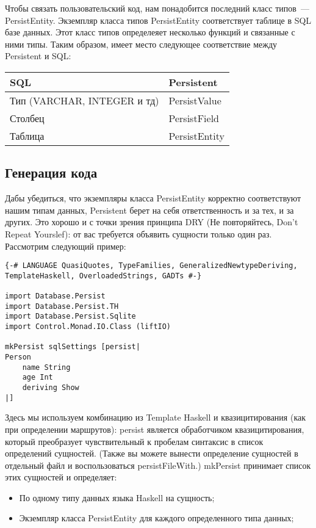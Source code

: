 Чтобы связать пользовательский код, нам понадобится последний класс типов~--- PersistEntity. Экземпляр класса типов PersistEntity соответствует таблице в SQL базе данных. Этот класс типов определеяет несколько функций и связанные с ними типы. Таким образом, имеет место следующее соответствие между Persistent и SQL:

\begin{center}
\begin{tabular}{ | l | l |}
\hline
SQL	& Persistent \\ \hline
Тип (VARCHAR, INTEGER и тд)	& PersistValue \\ \hline
Столбец & PersistField \\ \hline
Таблица	& PersistEntity \\ \hline
\end{tabular}
\end{center}

\subsection{Генерация кода} %

Дабы убедиться, что экземпляры класса PersistEntity корректно соответствуют нашим типам данных, Persistent берет на себя ответственность и за тех, и за других. Это хорошо и с точки зрения принципа DRY (Не повторяйтесь, Don't Repeat Yourslef): от вас требуется объявить сущности только один раз. Рассмотрим следующий пример:

\begin{lstlisting}
{-# LANGUAGE QuasiQuotes, TypeFamilies, GeneralizedNewtypeDeriving, TemplateHaskell, OverloadedStrings, GADTs #-}

import Database.Persist
import Database.Persist.TH
import Database.Persist.Sqlite
import Control.Monad.IO.Class (liftIO)

mkPersist sqlSettings [persist|
Person
    name String
    age Int
    deriving Show
|]
\end{lstlisting}

Здесь мы используем комбинацию из Template Haskell и квазицитирования (как при
определении маршрутов): persist является обработчиком квазицитирования, который
преобразует чувствительный к пробелам синтаксис в список определений сущностей.
(Также вы можете вынести определение сущностей в отдельный файл и
воспользоваться persistFileWith.) mkPersist принимает список этих сущностей и определяет:

\begin{itemize}
  \item По одному типу данных языка Haskell на сущность;
  \item Экземпляр класса PersistEntity для каждого определенного типа данных;
\end{itemize}

